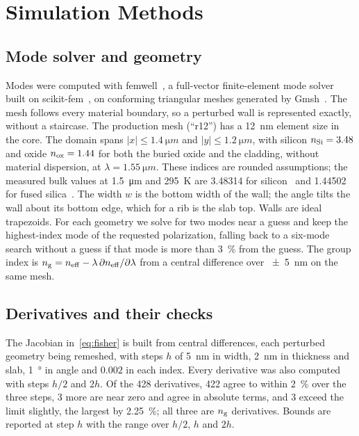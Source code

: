 \section{Simulation Methods}
\label{sec:methods}

\subsection{Mode solver and geometry}

Modes were computed with femwell~\cite{femwell}, a full-vector finite-element mode solver built on
scikit-fem~\cite{gustafsson2020}, on conforming triangular meshes generated by Gmsh~\cite{geuzaine2009}. The mesh
follows every material boundary, so a perturbed wall is represented exactly, without a staircase. The
production mesh (``r12'') has a \qty{12}{nm} element size in the core. The domain spans
$|x|\le\qty{1.4}{\micro m}$ and $|y|\le\qty{1.2}{\micro m}$, with silicon $n_\mathrm{Si}=3.48$ and oxide $n_\mathrm{ox}=1.44$ for both the buried oxide and the
cladding, without material dispersion, at $\lambda=\qty{1.55}{\micro m}$. These indices are rounded assumptions; the
measured bulk values at \qty{1.5}{\micro m} and \qty{295}{K} are \num{3.48314} for silicon~\cite{frey2006} and
\num{1.44502} for fused silica~\cite{leviton2008}. The width $w$ is the bottom width of the wall; the angle tilts the
wall about its bottom edge, which for a rib is the slab top. Walls are ideal trapezoids. For each geometry we solve for
two modes near a guess and keep the highest-index mode of the requested polarization, falling back to a six-mode search
without a guess if that mode is more than \qty{3}{\percent} from the guess. The group index is
$n_\mathrm{g}=n_\mathrm{eff}-\lambda\,\partial n_\mathrm{eff}/\partial\lambda$ from a central difference over \qty{\pm 5}{nm} on the same mesh.

\subsection{Derivatives and their checks}

The Jacobian in~\eqref{eq:fisher} is built from central differences, each perturbed geometry being remeshed, with
steps $h$ of \qty{5}{nm} in width, \qty{2}{nm} in thickness and slab, \qty{1}{\degree} in angle and $0.002$ in each
index. Every derivative was also computed with steps $h/2$ and $2h$. Of the 428 derivatives, 422 agree to within
\qty{2}{\percent} over the three steps, 3 more are near zero and agree in absolute terms, and 3 exceed the limit
slightly, the largest by \qty{2.25}{\percent}; all three are $n_\mathrm{g}$ derivatives. Bounds are reported at step $h$ with
the range over $h/2$, $h$ and $2h$.

